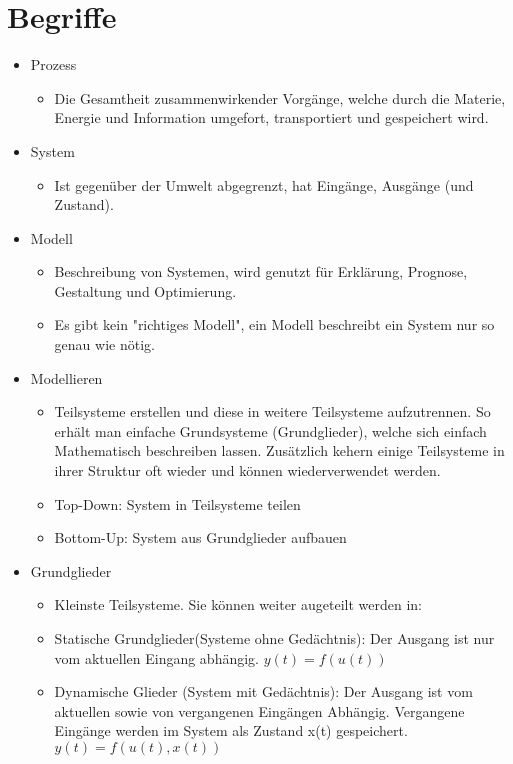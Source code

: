\documentclass[margin=normal]{tex/hsrzf}
\begin{document}
\section{Begriffe}
\begin{itemize}
  \item Prozess
        \begin{itemize}
          \item Die Gesamtheit zusammenwirkender Vorgänge, welche durch
                die Materie, Energie und Information
                umgefort, transportiert und gespeichert wird.
        \end{itemize}

  \item System
        \begin{itemize}
          \item Ist gegenüber der Umwelt abgegrenzt, hat Eingänge,
                Ausgänge (und Zustand).
        \end{itemize}

  \item Modell
        \begin{itemize}
          \item Beschreibung von Systemen, wird genutzt für
                Erklärung, Prognose, Gestaltung und Optimierung.
          \item Es gibt kein "richtiges Modell",
                ein Modell beschreibt ein System nur so genau wie nötig.
        \end{itemize}
  \item Modellieren
        \begin{itemize}
          \item Teilsysteme erstellen und diese
                in weitere Teilsysteme aufzutrennen.
                So erhält man einfache Grundsysteme (Grundglieder),
                welche sich einfach Mathematisch beschreiben lassen.
                Zusätzlich kehern einige Teilsysteme in ihrer
                Struktur oft wieder und können wiederverwendet werden.

          \item Top-Down: System in Teilsysteme teilen
          \item Bottom-Up: System aus Grundglieder aufbauen
        \end{itemize}
  \item Grundglieder
        \begin{itemize}
          \item Kleinste Teilsysteme. Sie können weiter augeteilt werden in:
          \item Statische Grundglieder(Systeme ohne Gedächtnis):
                Der Ausgang ist nur vom aktuellen Eingang abhängig.
                $y(t)=f(u(t))$
          \item Dynamische Glieder (System mit Gedächtnis):
                Der Ausgang ist vom aktuellen sowie von vergangenen Eingängen Abhängig.
                Vergangene Eingänge werden im System als Zustand x(t) gespeichert.
                $y(t)=f(u(t),x(t))$
        \end{itemize}
\end{itemize}
\end{document}
